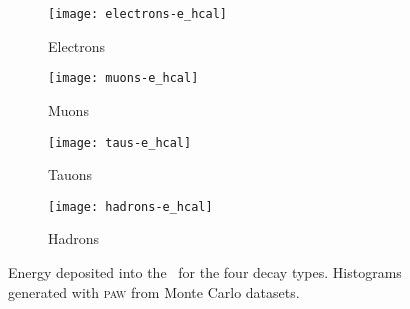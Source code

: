\begin{figure}
    \centering
    \begin{subfigure}[c]{0.48\linewidth}
        \centering
        \texttt{[image: electrons-e\_hcal]}
        \caption{%
            Electrons
        }
        \label{fig:paw-e_hcal/electrons}
    \end{subfigure}
    \hfill
    \begin{subfigure}[c]{0.48\linewidth}
        \centering
        \texttt{[image: muons-e\_hcal]}
        \caption{%
            Muons
        }
        \label{fig:paw-e_hcal/muons}
    \end{subfigure}

    \vspace{2ex}

    \begin{subfigure}[c]{0.48\linewidth}
        \centering
        \texttt{[image: taus-e\_hcal]}
        \caption{%
            Tauons
        }
        \label{fig:paw-e_hcal/tauons}
    \end{subfigure}
    \hfill
    \begin{subfigure}[c]{0.48\linewidth}
        \centering
        \texttt{[image: hadrons-e\_hcal]}
        \caption{%
            Hadrons
        }
        \label{fig:paw-e_hcal/hadrons}
    \end{subfigure}
    \caption{%
        Energy deposited into the \ehcal\ for the four decay types.
        Histograms generated with \textsc{paw} from Monte Carlo datasets.
    }
    \label{fig:paw-e_hcal}
\end{figure}
